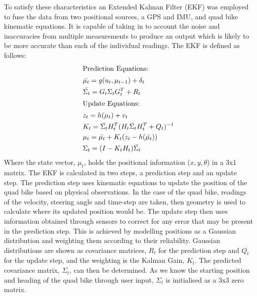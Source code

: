 \documentclass[main.tex]{subfiles}
\begin{document}
To satisfy these characteristics an Extended Kalman Filter (EKF) was employed to fuse the data from two positional sources, a GPS and IMU, and quad bike kinematic equations. It is capable of taking in to account the noise and inaccuracies from multiple measurements to produce an output which is likely to be more accurate than each of the individual readings. The EKF is defined as follows:
\begin{align*}
\shortintertext{Prediction Equations:}
&\bar{\mu_t} = g(u_t, \mu_{t-1}) + \delta_t\\
&\bar{\Sigma_t} = G_t\Sigma_tG_t^T + R_t\\
\shortintertext{Update Equations:}
&z_t = h(\mu_t) + v_t\\
&K_t = \bar{\Sigma_t}H_t^T(H_t\bar{\Sigma_t}H_t^T + Q_t)^{-1}\\
&\mu_t = \bar{\mu_t} + K_t(z_t-h(\bar{\mu_t}))\\
&\Sigma_t = (I - K_tH_t)\bar{\Sigma_t}
\end{align*}
Where the state vector, $\mu_t$, holds the positional information ($x, y, \theta$) in a 3x1 matrix. The EKF is calculated in two steps, a prediction step and an update step. The prediction step uses kinematic equations to update the position of the quad bike based on physical observations. In the case of the quad bike, readings of the velocity, steering angle and time-step are taken, then geometry is used to calculate where its updated position would be. The update step then uses information obtained through sensors to correct for any error that may be present in the prediction step. This is achieved by modelling positions as a Gaussian distribution and weighting them according to their reliability. Gaussian distributions are shown as covariance matrices, $R_t$ for the prediction step and $Q_t$ for the update step, and the weighting is the Kalman Gain, $K_t$. The predicted covariance matrix, $\Sigma_t$, can then be determined. As we know the starting position and heading of the quad bike through user input, $\Sigma_t$ is initialised as a 3x3 zero matrix.
\end{document}
